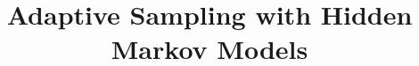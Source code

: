 \documentclass{article} %
\title{Adaptive Sampling with Hidden Markov Models}
\author{
  
}
\begin{document}
\maketitle

\begin{abstract}
  
\end{abstract}





\end{document}
